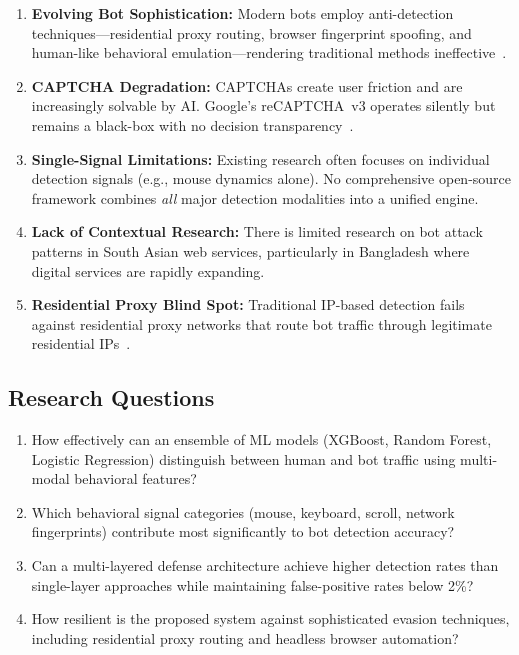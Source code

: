 \documentclass[12pt, a4paper]{article}
\begin{document}
\begin{enumerate}[leftmargin=*, label=\textbf{C\arabic*.}]
    \item \textbf{Evolving Bot Sophistication:} Modern bots employ anti-detection techniques---residential proxy routing, browser fingerprint spoofing, and human-like behavioral emulation---rendering traditional methods ineffective~\cite{iliou2021}.
    \item \textbf{CAPTCHA Degradation:} CAPTCHAs create user friction and are increasingly solvable by AI. Google's reCAPTCHA~v3 operates silently but remains a black-box with no decision transparency~\cite{akrout2019}.
    \item \textbf{Single-Signal Limitations:} Existing research often focuses on individual detection signals (e.g., mouse dynamics alone). No comprehensive open-source framework combines \textit{all} major detection modalities into a unified engine.
    \item \textbf{Lack of Contextual Research:} There is limited research on bot attack patterns in South Asian web services, particularly in Bangladesh where digital services are rapidly expanding.
    \item \textbf{Residential Proxy Blind Spot:} Traditional IP-based detection fails against residential proxy networks that route bot traffic through legitimate residential IPs~\cite{mi2019}.
\end{enumerate}

\subsection{Research Questions}

\begin{enumerate}[leftmargin=*, label=\textbf{RQ\arabic*.}]
    \item How effectively can an ensemble of ML models (XGBoost, Random Forest, Logistic Regression) distinguish between human and bot traffic using multi-modal behavioral features?
    \item Which behavioral signal categories (mouse, keyboard, scroll, network fingerprints) contribute most significantly to bot detection accuracy?
    \item Can a multi-layered defense architecture achieve higher detection rates than single-layer approaches while maintaining false-positive rates below 2\%?
    \item How resilient is the proposed system against sophisticated evasion techniques, including residential proxy routing and headless browser automation?
\end{enumerate}
\end{document}
